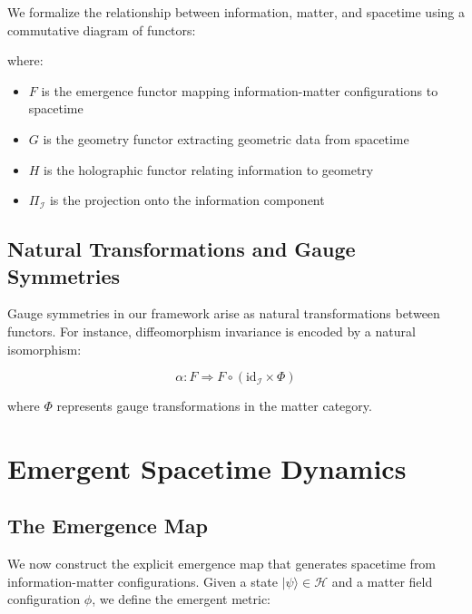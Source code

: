 \documentclass[12pt,a4paper]{article}
\begin{document}
We formalize the relationship between information, matter, and spacetime using a commutative diagram of functors:

\begin{center}
\end{center}

where:
\begin{itemize}
\item $F$ is the emergence functor mapping information-matter configurations to spacetime
\item $G$ is the geometry functor extracting geometric data from spacetime
\item $H$ is the holographic functor relating information to geometry
\item $\Pi_\mathcal{I}$ is the projection onto the information component
\end{itemize}

\subsection{Natural Transformations and Gauge Symmetries}

Gauge symmetries in our framework arise as natural transformations between functors. For instance, diffeomorphism invariance is encoded by a natural isomorphism:

\begin{equation}
\alpha: F \Rightarrow F \circ (\text{id}_\mathcal{I} \times \Phi)
\end{equation}

where $\Phi$ represents gauge transformations in the matter category.

\section{Emergent Spacetime Dynamics}

\subsection{The Emergence Map}

We now construct the explicit emergence map that generates spacetime from information-matter configurations. Given a state $|\psi\rangle \in \mathcal{H}$ and a matter field configuration $\phi$, we define the emergent metric:
\end{document}

